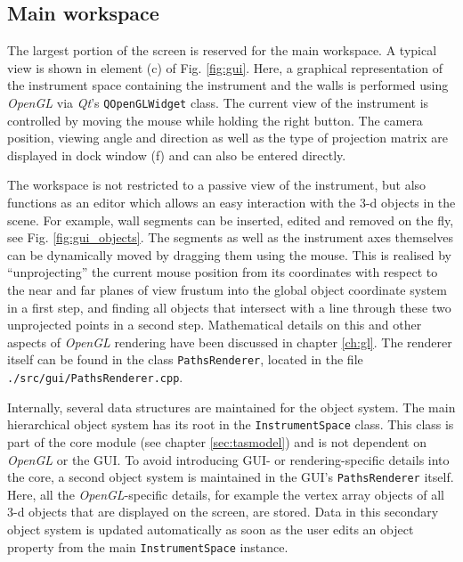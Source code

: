 \subsection{Main workspace}
\label{sec:gui_gl}
The largest portion of the screen is reserved for the main workspace.
A typical view is shown in element (c) of Fig. \ref{fig:gui}.
Here, a graphical representation of the instrument space containing the instrument and the walls 
is performed using \textit{OpenGL} \cite{web_OpenGL} via \textit{Qt}'s
\lstinline[language=C++]|QOpenGLWidget| \cite{web_QOpenGLWidget} class.
The current view of the instrument is controlled by moving the mouse while holding the right button.
The camera position, viewing angle and direction as well as the type of projection matrix are 
displayed in dock window (f) and can also be entered directly.

The workspace is not restricted to a passive view of the instrument, but also functions as an editor
which allows an easy interaction with the 3-d objects in the scene. For example, wall segments can
be inserted, edited and removed on the fly, see Fig. \ref{fig:gui_objects}.
The segments as well as the instrument axes themselves can be dynamically moved by dragging them using the 
mouse. This is realised by ``unprojecting'' the current mouse position from its coordinates with respect 
to the near and far planes of view frustum into the global object coordinate system in a first step, 
and finding all objects that intersect with a line through these two unprojected points in a second step. 
Mathematical details on this and other aspects of \textit{OpenGL} rendering have been discussed 
in chapter \ref{ch:gl}.
The renderer itself can be found in the class \lstinline[language=C++]|PathsRenderer|, located in
the file \lstinline|./src/gui/PathsRenderer.cpp|.

Internally, several data structures are maintained for the object system. 
The main hierarchical object system has its root in the \lstinline[language=C++]|InstrumentSpace|
class. This class is part of the core module (see chapter \ref{sec:tasmodel}) and is not dependent
on \textit{OpenGL} or the GUI.
To avoid introducing GUI- or rendering-specific details into the core, a second object
system is maintained in the GUI's \lstinline[language=C++]|PathsRenderer| itself. 
Here, all the \textit{OpenGL}-specific details, for example the vertex array objects \cite{wiki_vao} 
of all 3-d objects that are displayed on the screen, are stored.
Data in this secondary object system is updated automatically as soon as the user edits an object 
property from the main \lstinline[language=C++]|InstrumentSpace| instance.


